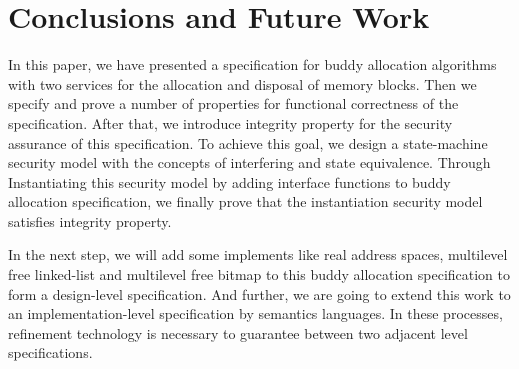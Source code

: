 \section{Conclusions and Future Work}
In this paper, we have presented a specification for buddy allocation algorithms with two services for the allocation and disposal of memory blocks. Then we specify and prove a number of properties for functional correctness of the specification. After that, we introduce integrity property for the security assurance of this specification. To achieve this goal, we design a state-machine security model with the concepts of interfering and state equivalence. Through Instantiating this security model by adding interface functions to buddy allocation specification, we finally prove that the instantiation security model satisfies integrity property.

In the next step, we will add some implements like real address spaces, multilevel free linked-list and multilevel free bitmap to this buddy allocation specification to form a design-level specification. And further, we are going to extend this work to an implementation-level specification by semantics languages. In these processes, refinement technology is necessary to guarantee between two adjacent level specifications.